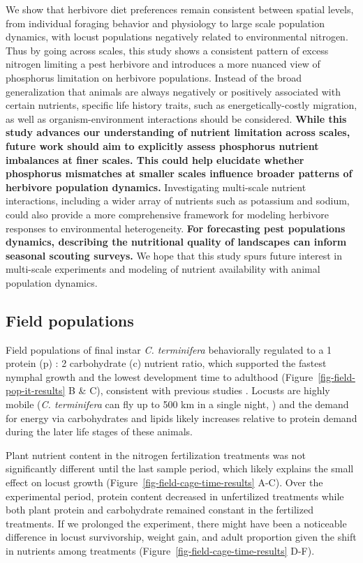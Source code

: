 \documentclass[
]{article}
\begin{document}
We show that herbivore diet preferences remain consistent between
spatial levels, from individual foraging behavior and physiology to
large scale population dynamics, with locust populations negatively
related to environmental nitrogen. Thus by going across scales, this
study shows a consistent pattern of excess nitrogen limiting a pest
herbivore and introduces a more nuanced view of phosphorus limitation on
herbivore populations. Instead of the broad generalization that animals
are always negatively or positively associated with certain nutrients,
specific life history traits, such as energetically-costly migration, as
well as organism-environment interactions should be considered.
\textbf{While this study advances our understanding of nutrient
limitation across scales, future work should aim to explicitly assess
phosphorus nutrient imbalances at finer scales. This could help
elucidate whether phosphorus mismatches at smaller scales influence
broader patterns of herbivore population dynamics.} Investigating
multi-scale nutrient interactions, including a wider array of nutrients
such as potassium and sodium, could also provide a more comprehensive
framework for modeling herbivore responses to environmental
heterogeneity. \textbf{For forecasting pest populations dynamics,
describing the nutritional quality of landscapes can inform seasonal
scouting surveys.} We hope that this study spurs future interest in
multi-scale experiments and modeling of nutrient availability with
animal population dynamics.

\subsection{Field populations}\label{field-populations}

Field populations of final instar \emph{C. terminifera} behaviorally
regulated to a 1 protein (p) : 2 carbohydrate (c) nutrient ratio, which
supported the fastest nymphal growth and the lowest development time to
adulthood (Figure~\ref{fig-field-pop-it-results} B \& C), consistent
with previous studies
\citep{clissold_regulation_2014, lawton_mismatched_2021}. Locusts are
highly mobile (\emph{C. terminifera} can fly up to 500 km in a single
night, \citep{deveson_not_2005}) and the demand for energy via
carbohydrates and lipids likely increases relative to protein demand
during the later life stages of these animals.

Plant nutrient content in the nitrogen fertilization treatments was not
significantly different until the last sample period, which likely
explains the small effect on locust growth
(Figure~\ref{fig-field-cage-time-results} A-C). Over the experimental
period, protein content decreased in unfertilized treatments while both
plant protein and carbohydrate remained constant in the fertilized
treatments. If we prolonged the experiment, there might have been a
noticeable difference in locust survivorship, weight gain, and adult
proportion given the shift in nutrients among treatments
(Figure~\ref{fig-field-cage-time-results} D-F).
\end{document}
